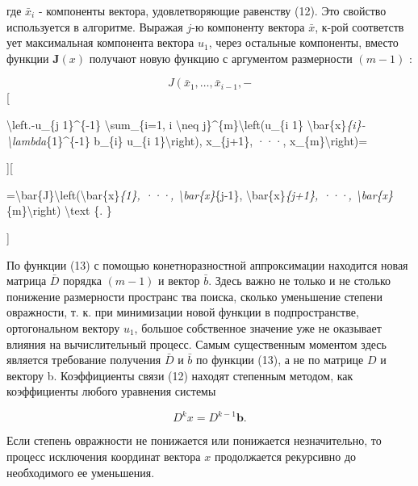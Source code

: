 \documentclass[10pt]{article}
\begin{document}
где $\bar{x}_{i}$ - компоненты вектора, удовлетворяющие равенству (12). Это свойство используется в алгоритме. Выражая $j$-ю компоненту вектора $\bar{x}$, к-рой соответств ует максимальная компонента вектора $u_{1}$, через остальные компоненты, вместо функции $\boldsymbol{J}(x)$ получают новую функцию с аргументом размерности $(m-1)$ :



\[

J\left(\bar{x}_{1}, \ldots, \bar{x}_{i-1},-\right.

\][



\textbackslash left.-u\_\{j 1\}\^{}\{-1\} \textbackslash sum\_\{i=1, i \textbackslash neq j\}\^{}\{m\}\textbackslash left(u\_\{i 1\} \textbackslash bar\{x\}\textit{\{i\}-\textbackslash lambda}\{1\}\^{}\{-1\} b\_\{i\} u\_\{i 1\}\textbackslash right), x\_\{j+1\}, ···, x\_\{m\}\textbackslash right)=



][



=\textbackslash bar\{J\}\textbackslash left(\textbackslash bar\{x\}\textit{\{1\}, ···, \textbackslash bar\{x\}}\{j-1\}, \textbackslash bar\{x\}\textit{\{j+1\}, ···, \textbackslash bar\{x\}}\{m\}\textbackslash right) \textbackslash text \{. \}

]



По функции (13) с помощью конетноразностной аппроксимации находится новая матрица $\bar{D}$ порядка $(m-1)$ и вектор $\bar{b}$. Здесь важно не только и не столько понижение размерности пространс тва поиска, сколько уменьшение степени овражности, т. к. при минимизации новой функции в подпространстве, ортогональном вектору $u_{1}$, большое собственное значение уже не оказывает влияния на вычислительный процесс. Самым существенным моментом здесь является требование получения $\bar{D}$ и $\bar{b}$ по функции (13), а не по матрице $D$ и вектору b. Коэффициенты связи (12) находят степенным методом, как коэффициенты любого уравнения системы



\[

D^{k} x=D^{k-1} \boldsymbol{b} .

\]



Если степень овражности не понижается или понижается незначительно, то процесс исключения координат вектора $x$ продолжается рекурсивно до необходимого ее уменьшения.
\end{document}
